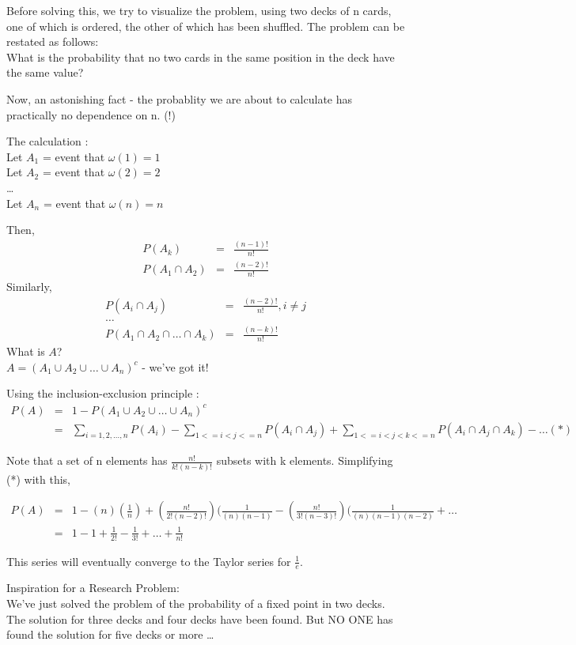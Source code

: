 Before solving this, we try to visualize the problem, using two decks of n cards, one of which is ordered, the other of which has been shuffled.  The problem can be restated as follows:\\
What is the probability that no two cards in the same position in the deck have the same value? 

Now, an astonishing fact - the probablity we are about to calculate has practically no dependence on n. (!)

The calculation : \\
Let $A_1$ = event that $\omega(1) = 1$\\
Let $A_2$ = event that $\omega(2) = 2$\\
\ldots\\
Let $A_n$ = event that $\omega(n) = n$

Then, 
\begin{eqnarray*}
P(A_k) &=& \frac {(n-1)!}{n!}\\
P(A_1 \cap A_2) &=& \frac {(n-2)!}{n!}
\end{eqnarray*}
Similarly,
\begin{eqnarray*}
P(A_i \cap A_j) &=& \frac {(n-2)!}{n!}, i \neq j\\
\ldots\\
P(A_1 \cap A_2 \cap \ldots \cap A_k) &=& \frac {(n-k)!}{n!}
\end{eqnarray*}
What is $A$?  \\
$A = (A_1 \cup A_2 \cup \ldots \cup A_n)^{c}$  - we've got it!

Using the inclusion-exclusion principle : 
\begin{eqnarray*}
P(A) &=& 1 - P(A_1 \cup A_2 \cup \ldots \cup A_n)^c \\
&=& \sum_{i=1, 2, \ldots, n} P(A_i) - \sum_{1 <= i < j <= n} P(A_i \cap A_j) + \sum_{1 <=i<j<k<= n} P(A_i \cap A_j \cap A_k)
- \ldots (*)
\end{eqnarray*}

Note that a set of n elements has $\frac{n!}{k!(n-k)!}$ subsets with k elements.  Simplifying (*) with this,

\begin{eqnarray*}
P(A) &=& 1 - (n)(\frac{1}{n}) + (\frac {n!}{2!(n-2)!})(\frac{1}{(n)(n-1)} - (\frac {n!}{3!(n-3)!})(\frac{1}{(n)(n-1)(n-2)} + \ldots\\
&=& 1 - 1 + \frac{1}{2!} - \frac{1}{3!} + \ldots + \frac{1}{n!}
\end{eqnarray*}

This series will eventually converge to the Taylor series for $\frac {1}{e}$.

Inspiration for a Research Problem:\\
We've just solved the problem of the probability of a fixed point in two decks.  The solution for three decks and four decks have been found.  But NO ONE has found the solution for five decks or more \ldots
